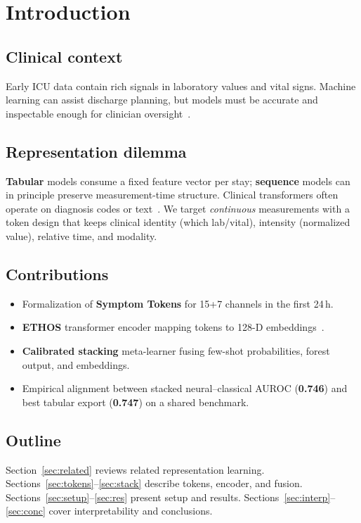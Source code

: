 \section{Introduction}
\label{sec:intro}

\subsection{Clinical context}
Early ICU data contain rich signals in laboratory values and vital signs. Machine learning can assist discharge planning, but models must be accurate and inspectable enough for clinician oversight~\citep{ghassemi2021practical}.

\subsection{Representation dilemma}
\textbf{Tabular} models consume a fixed feature vector per stay; \textbf{sequence} models can in principle preserve measurement-time structure. Clinical transformers often operate on diagnosis codes or text~\citep{li2020behrt,rasmy2021med}. We target \emph{continuous} measurements with a token design that keeps clinical identity (which lab/vital), intensity (normalized value), relative time, and modality.

\subsection{Contributions}
\begin{itemize}
  \item Formalization of \textbf{Symptom Tokens} for 15+7 channels in the first 24\,h.
  \item \textbf{ETHOS} transformer encoder mapping tokens to 128-D embeddings~\citep{sharafi2023ethos,vaswani2017attention}.
  \item \textbf{Calibrated stacking} meta-learner fusing few-shot probabilities, forest output, and embeddings.
  \item Empirical alignment between stacked neural--classical AUROC (\textbf{0.746}) and best tabular export (\textbf{0.747}) on a shared benchmark.
\end{itemize}

\subsection{Outline}
Section~\ref{sec:related} reviews related representation learning. Sections~\ref{sec:tokens}--\ref{sec:stack} describe tokens, encoder, and fusion. Sections~\ref{sec:setup}--\ref{sec:res} present setup and results. Sections~\ref{sec:interp}--\ref{sec:conc} cover interpretability and conclusions.
